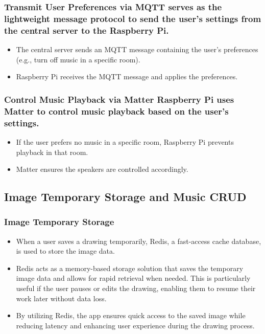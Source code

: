 \documentclass[conference]{IEEEtran}
\begin{document}
\subsubsection{Transmit User Preferences via MQTT serves as the lightweight message protocol to send the user's settings from the central server to the Raspberry Pi.}
\begin{itemize}
    \item The central server sends an MQTT message containing the user's preferences (e.g., turn off music in a specific room).\\
    \item Raspberry Pi receives the MQTT message and applies the preferences.\\
\end{itemize}

\subsubsection{Control Music Playback via Matter Raspberry Pi uses Matter to control music playback based on the user’s settings.}
\begin{itemize}
    \item If the user prefers no music in a specific room, Raspberry Pi prevents playback in that room.\\
    \item Matter ensures the speakers are controlled accordingly.\\
\end{itemize}


\subsection{Image Temporary Storage and Music CRUD}

\subsubsection{Image Temporary Storage}
\begin{itemize}
    \item When a user saves a drawing temporarily, Redis, a fast-access cache database, is used to store the image data. \\
    \item Redis acts as a memory-based storage solution that saves the temporary image data and allows for rapid retrieval when needed. This is particularly useful if the user pauses or edits the drawing, enabling them to resume their work later without data loss. \\
    \item By utilizing Redis, the app ensures quick access to the saved image while reducing latency and enhancing user experience during the drawing process.\\
\end{itemize}
\end{document}
